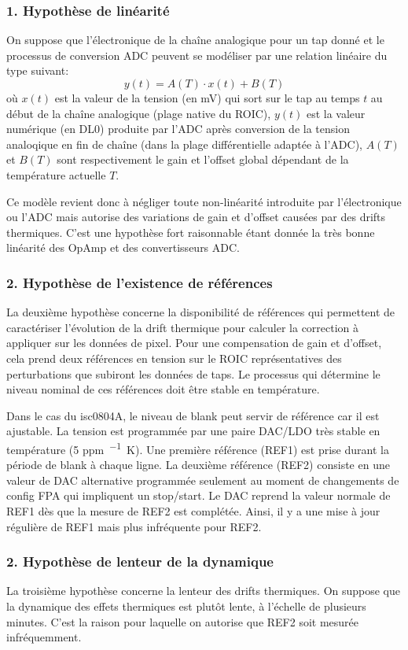 \documentclass[11pt]{report}
\begin{document}
\subsubsection{1. Hypothèse de linéarité}
On suppose que l'électronique de la chaîne analogique pour un tap donné et le processus de conversion ADC peuvent se modéliser par une relation linéaire du type suivant:
\[y(t) = A(T)\cdot{}x(t) + B(T)\]
où $x(t)$ est la valeur de la tension (en \unit{mV}) qui sort sur le tap au temps $t$ au début de la chaîne analogique (plage native du ROIC), $y(t)$ est la valeur numérique (en DL0) produite par l'ADC après conversion de la tension analoqique en fin de chaîne (dans la plage différentielle adaptée à l'ADC), $A(T)$ et $B(T)$ sont respectivement le gain et l'offset global dépendant de la température actuelle $T$.

Ce modèle revient donc à négliger toute non-linéarité introduite par l'électronique ou l'ADC mais autorise des variations de gain et d'offset causées par des drifts thermiques. C'est une hypothèse fort raisonnable étant donnée la très bonne linéarité des OpAmp et des convertisseurs ADC.

\subsubsection{2. Hypothèse de l'existence de références}
La deuxième hypothèse concerne la disponibilité de références qui permettent de caractériser l'évolution de la drift thermique pour calculer la correction à appliquer sur les données de pixel. Pour une compensation de gain et d'offset, cela prend deux références en tension sur le ROIC représentatives des perturbations que subiront les données de taps. Le processus qui détermine le niveau nominal de ces références doit être stable en température.

Dans le cas du isc0804A, le niveau de blank peut servir de référence car il est ajustable. La tension est programmée par une paire DAC/LDO très stable en température (\num{5} \unit{ppm\per{}K}). Une première référence (REF1) est prise durant la période de blank à chaque ligne. La deuxième référence (REF2) consiste en une valeur de DAC alternative programmée seulement au moment de changements de config FPA qui impliquent un stop/start. Le DAC reprend la valeur normale de REF1 dès que la mesure de REF2 est complétée. Ainsi, il y a une mise à jour régulière de REF1 mais plus infréquente pour REF2.

\subsubsection{2. Hypothèse de lenteur de la dynamique}
La troisième hypothèse concerne la lenteur des drifts thermiques. On suppose que la dynamique des effets thermiques est plutôt lente, à l'échelle de plusieurs minutes. C'est la raison pour laquelle on autorise que REF2 soit mesurée infréquemment.
\end{document}
